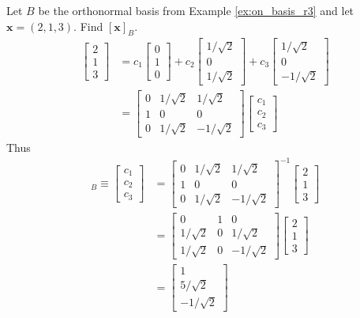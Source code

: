 \documentclass[12pt,letterpaper,reqno]{article}
\numberwithin{equation}{section}
\newcommand{\bx}{\mathbf{x}}
\begin{document}
\begin{example}\label{ex:long}
	Let $B$ be the orthonormal basis from Example \ref{ex:on_basis_r3} and let $\bx=(2,1,3)$. Find $[\bx]_B$.
\begin{align*}
	\begin{bmatrix}
		2 \\ 1 \\ 3
	\end{bmatrix}&=c_1\begin{bmatrix}
		0 \\ 1 \\ 0
	\end{bmatrix}+c_2\begin{bmatrix}
		1/\sqrt{2} \\ 0 \\ 1/\sqrt{2}
	\end{bmatrix}+c_3\begin{bmatrix}
		1/\sqrt{2} \\ 0 \\ -1/\sqrt{2}
	\end{bmatrix} \\
	&=\begin{bmatrix}
		0 & 1/\sqrt{2} & 1/\sqrt{2} \\
		1 & 0 & 0 \\
		0 & 1/\sqrt{2} & -1/\sqrt{2}
	\end{bmatrix}\begin{bmatrix}
		c_1 \\ c_2 \\ c_3
	\end{bmatrix}
\end{align*}
Thus
\begin{align*}
	[\bx]_B\equiv\begin{bmatrix}
		c_1 \\ c_2 \\ c_3
	\end{bmatrix}&=\begin{bmatrix}
		0 & 1/\sqrt{2} & 1/\sqrt{2} \\
		1 & 0 & 0 \\
		0 & 1/\sqrt{2} & -1/\sqrt{2}
	\end{bmatrix}^{-1}\begin{bmatrix}
		2 \\ 1 \\ 3
	\end{bmatrix} \\
	&=\begin{bmatrix}
		0 & 1 & 0 \\
		1/\sqrt{2} & 0 & 1/\sqrt{2} \\
		1/\sqrt{2} & 0 & -1/\sqrt{2}
	\end{bmatrix}\begin{bmatrix}
		2 \\ 1 \\ 3
	\end{bmatrix} \\
	&=\begin{bmatrix}
		1 \\ 5/\sqrt{2} \\ -1/\sqrt{2}
	\end{bmatrix}
\end{align*}
\end{example}
\end{document}
